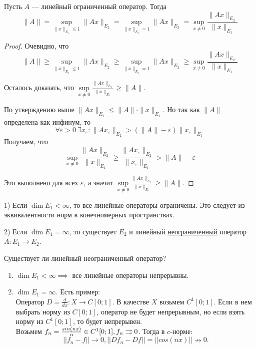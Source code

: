 \begin{statement}
Пусть $A$ --- линейный ограниченный оператор. Тогда 
\[
\|A\| = \sup_{\|x\|_{E_1} \leqslant 1} \|Ax\|_{E_2} = \sup_{\|x\|_{E_1} = 1} \|Ax\|_{E_2} = 
\sup_{x \neq 0} \frac{\|Ax\|_{E_2}}{\|x\|_{E_1}}
\]
\end{statement}

\begin{proof}
Очевидно, что 
\[
\|A\| \geqslant \sup_{\|x\|_{E_1} \leqslant 1} \|Ax\|_{E_2} \geqslant \sup_{\|x\|_{E_1} = 1} \|Ax\|_{E_2} \geqslant 
\sup_{x \neq 0} \frac{\|Ax\|_{E_2}}{\|x\|_{E_1}}
\]

Осталось доказать, что $\sup\limits_{x \neq 0} \frac{\|Ax\|_{E_2}}{\|x\|_{E_1}} \geqslant \|A\|$.

По утверждению выше $\|Ax\|_{E_2} \leqslant \|A\| \cdot \|x\|_{E_1}$. Но так как $\|A\|$ определена как инфинум, то
\[
\forall \varepsilon > 0\ \exists x_{\varepsilon} : 
\|A x_{\varepsilon}\|_{E_2} > (\|A\| - \varepsilon) \|x_{\varepsilon}\|_{E_1}
\]
Получаем, что
\[
\sup_{x \neq 0} \frac{\|Ax\|_{E_2}}{\|x\|_{E_1}} \geqslant
\frac{\|Ax_{\varepsilon}\|_{E_2}}{\|x_{\varepsilon}\|_{E_1}} > \|A\| - \varepsilon
\]

Это выполнено для всех $\varepsilon$, 
а значит $\sup\limits_{x \neq 0} \frac{\|Ax\|_{E_2}}{\|x\|_{E_1}} \geqslant \|A\|$.
\end{proof}

\begin{note}
1) Если $\dim E_1 < \infty$, то все линейные операторы ограничены. Это следует из эквивалентности норм в конечномерных пространствах.

2) Если $\dim E_1 = \infty$, то существует $E_2$ и линейный \underline{неограниченный} оператор $A: E_1 \to E_2$.
\end{note}

\begin{example}
    Существует ли линейный неограниченный оператор?
    \begin{enumerate}
        \item $\dim E_1 < \infty \implies$ все линейные операторы непрерывны.
        \item $\dim E_1 = \infty$. Есть пример:\\
        Оператор $D = \frac{d}{dx}: X \to C[0; 1]$. В качестве $X$ возьмем $C^1[0; 1]$. Если в нем выбрать норму из $C[0; 1]$, оператор не будет непрерывным, но если взять норму из $C^1[0; 1]$, то будет непрерывен.\\
        Возьмем $f_n = \frac{sin(nx)}{n} \in C^1[0; 1], f_n \rightrightarrows 0$. Тогда в $c$-норме: 
        \[
        ||f_n - f|| \to 0, ||D f_n - Df|| = ||cos(nx)|| \nrightarrow 0.
        \]
    \end{enumerate}
\end{example}

